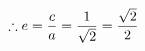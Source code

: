 \documentclass[preview]{standalone}
\begin{document}
\begin{align*}
\special{dvisvgm:raw <g id='unique000'>}\therefore e=\frac{c}{a}=\frac{1}{\sqrt{2}}=\frac{\sqrt{2}}{2}\special{dvisvgm:raw </g>}
\end{align*}
\end{document}
